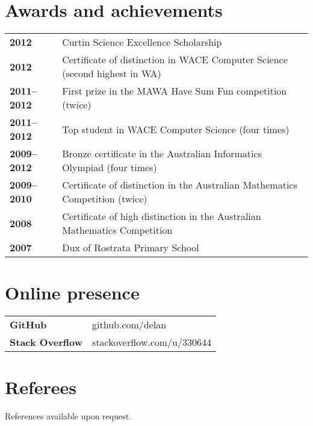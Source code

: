 \documentclass[a4paper,12pt]{article}
\begin{document}
\section*{Awards and achievements}

\begin{tabular}{p{4cm}p{14cm}}
	\textbf{2012} &
		Curtin Science Excellence Scholarship \\
	\textbf{2012} &
		Certificate of distinction in WACE Computer Science
		(second highest in WA) \\
	\textbf{2011--2012} &
		First prize in the MAWA Have Sum Fun competition (twice) \\
	\textbf{2011--2012} &
		Top student in WACE Computer Science (four times) \\
	\textbf{2009--2012} &
		Bronze certificate in the Australian Informatics Olympiad
		(four times) \\
	\textbf{2009--2010} &
		Certificate of distinction in the Australian Mathematics
		Competition (twice) \\
	\textbf{2008} &
		Certificate of high distinction in the Australian Mathematics
		Competition \\
	\textbf{2007} &
		Dux of Rostrata Primary School \\
\end{tabular}

\vspace{0.5cm}

\begin{minipage}[t]{9cm}
\section*{Online presence}
\begin{tabular}{ll}
	\textbf{GitHub} &
		github.com/delan \\
	\textbf{Stack Overflow} &
		stackoverflow.com/u/330644 \\
\end{tabular}
\end{minipage}\hfill\begin{minipage}[t]{9cm}
\section*{Referees}
References available upon request.
\end{minipage}
\end{document}
